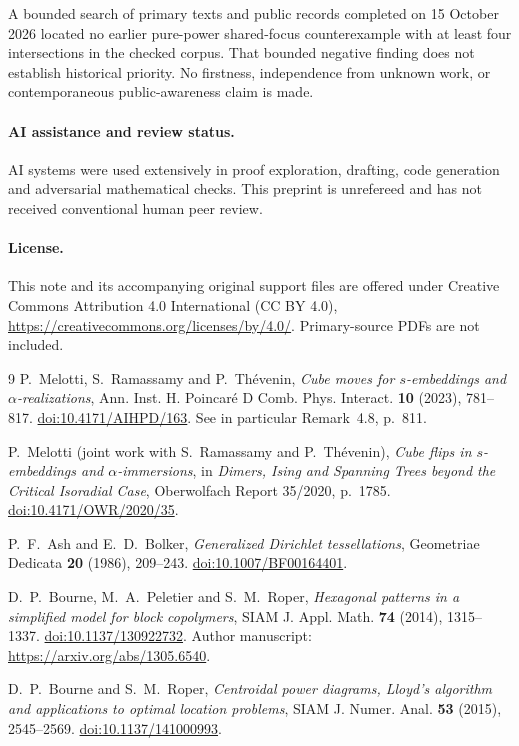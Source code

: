 \documentclass[11pt]{article}
\begin{document}
A bounded search of primary texts and public records completed on 15 October 2026 located no earlier pure-power shared-focus counterexample with at least four intersections in the checked corpus. That bounded negative finding does not establish historical priority. No firstness, independence from unknown work, or contemporaneous public-awareness claim is made.

\paragraph{AI assistance and review status.}
AI systems were used extensively in proof exploration, drafting, code generation and adversarial mathematical checks. This preprint is unrefereed and has not received conventional human peer review.

\paragraph{License.}
This note and its accompanying original support files are offered under Creative Commons Attribution 4.0 International (CC BY 4.0), \url{https://creativecommons.org/licenses/by/4.0/}. Primary-source PDFs are not included.

\begin{thebibliography}{9}
P.~Melotti, S.~Ramassamy and P.~Th\'evenin,
\emph{Cube moves for $s$-embeddings and $\alpha$-realizations},
Ann. Inst. H. Poincar\'e D Comb. Phys. Interact. \textbf{10} (2023), 781--817.
\href{https://doi.org/10.4171/AIHPD/163}{doi:10.4171/AIHPD/163}.
See in particular Remark~4.8, p.~811.

P.~Melotti (joint work with S.~Ramassamy and P.~Th\'evenin),
\emph{Cube flips in $s$-embeddings and $\alpha$-immersions},
in \emph{Dimers, Ising and Spanning Trees beyond the Critical Isoradial Case},
Oberwolfach Report 35/2020, p.~1785.
\href{https://doi.org/10.4171/OWR/2020/35}{doi:10.4171/OWR/2020/35}.

P.~F.~Ash and E.~D.~Bolker,
\emph{Generalized Dirichlet tessellations},
Geometriae Dedicata \textbf{20} (1986), 209--243.
\href{https://doi.org/10.1007/BF00164401}{doi:10.1007/BF00164401}.

D.~P.~Bourne, M.~A.~Peletier and S.~M.~Roper,
\emph{Hexagonal patterns in a simplified model for block copolymers},
SIAM J. Appl. Math. \textbf{74} (2014), 1315--1337.
\href{https://doi.org/10.1137/130922732}{doi:10.1137/130922732}.
Author manuscript: \url{https://arxiv.org/abs/1305.6540}.

D.~P.~Bourne and S.~M.~Roper,
\emph{Centroidal power diagrams, Lloyd's algorithm and applications to optimal location problems},
SIAM J. Numer. Anal. \textbf{53} (2015), 2545--2569.
\href{https://doi.org/10.1137/141000993}{doi:10.1137/141000993}.
\end{thebibliography}
\end{document}
